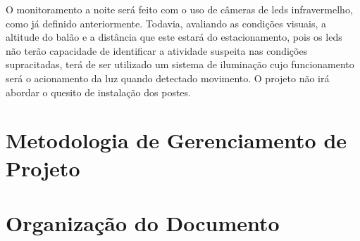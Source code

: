   O monitoramento a noite será feito com o uso de câmeras de leds infravermelho, como já definido anteriormente. Todavia, avaliando as condições visuais, a altitude do balão e a distância que este estará do estacionamento, pois os leds não terão capacidade  de identificar a atividade suspeita nas condições supracitadas, terá de ser utilizado um sistema de iluminação cujo funcionamento será o acionamento da luz quando detectado movimento. O projeto não irá abordar o quesito de instalação dos postes.

\section{Metodologia de Gerenciamento de Projeto} %


\section{Organização do Documento} %
\label{sec:organiza_o_do_documento}

